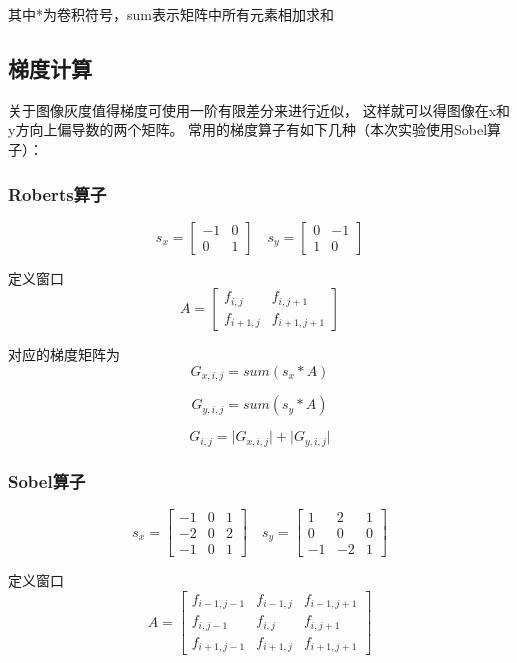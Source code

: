 \documentclass{article}
\begin{document}
    其中*为卷积符号，sum表示矩阵中所有元素相加求和

\subsection{梯度计算}\label{operator}

    关于图像灰度值得梯度可使用一阶有限差分来进行近似，
    这样就可以得图像在x和y方向上偏导数的两个矩阵。
    常用的梯度算子有如下几种（本次实验使用Sobel算子）：

\subsubsection{Roberts算子}

\[
s_x =
\begin{bmatrix}-1 & 0 \\ 0 & 1
\end{bmatrix}
\quad
s_y =
\begin{bmatrix}0 & -1 \\ 1 & 0
\end{bmatrix}
\]

定义窗口\[A = \begin{bmatrix}f_{i,j} & f_{i, j + 1} \\ f_{i + 1, j} & f_{i + 1, j + 1}
\end{bmatrix}\]

对应的梯度矩阵为
\[
G_{x, i,j} = sum\left( s_x * A \right)
\]

\[G_{y, i,j} = sum\left( s_y * A \right)
\]

\[G_{i,j} = \lvert  G_{x, i,j}\rvert + \lvert G_{y, i,j}\rvert \]

\subsubsection{Sobel算子}\label{sobel}

\[
s_x =
\begin{bmatrix}-1 & 0 & 1\\ -2 & 0 & 2 \\ -1 & 0 & 1
\end{bmatrix}
\quad
s_y =
\begin{bmatrix}1 & 2 & 1 \\ 0 & 0 & 0 \\ -1 & -2 & 1
\end{bmatrix}
\]

定义窗口\[A = \begin{bmatrix}f_{i - 1, j - 1} & f_{i - 1, j} & f_{i - 1, j + 1} \\f_{i, j - 1} & f_{i,j} & f_{i, j + 1} \\ f_{i + 1, j - 1} & f_{i + 1, j} & f_{i + 1, j + 1}
\end{bmatrix}\]
\end{document}
